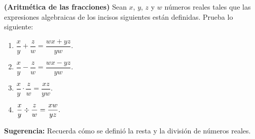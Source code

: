 \documentclass[12pt,a4paper]{article}
\begin{document}
    \begin{problema}
        \textbf{(Aritmética de las fracciones)} Sean $x$, $y$, $z$ y $w$ números reales tales que las expresiones algebraicas de los incisos siguientes
        están definidas. Prueba lo siguiente:
        \begin{enumerate}
            \item[(a)] $\dfrac{x}{y}+\dfrac{z}{w}=\dfrac{wx+yz}{yw}.$
            \item[(b)] $\dfrac{x}{y}-\dfrac{z}{w}=\dfrac{wx-yz}{yw}.$
            \item[(c)] $\dfrac{x}{y}\cdot\dfrac{z}{w}=\dfrac{xz}{yw}.$
            \item[(d)] $\dfrac{x}{y}\mathbin{\divisionsymbol}\dfrac{z}{w}=\dfrac{xw}{yz}.$
        \end{enumerate}
        \textbf{Sugerencia:} Recuerda cómo se definió la resta y la división de números reales.
    \end{problema}
\end{document}
